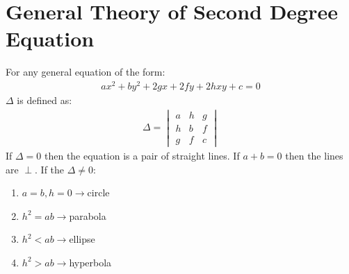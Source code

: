 \documentclass[../main.tex]{subfile}
\begin{document}
    \chapter{General Theory of Second Degree Equation}
    For any general equation of the form:
    \begin{align}
        ax^2+by^2+2gx+2fy+2hxy+c=0
    \end{align}
    $\Delta$ is defined as:
    \begin{align}
        \Delta=\begin{vmatrix}
        a&h&g\\
        h&b&f\\
        g&f&c
        \end{vmatrix}
    \end{align}
    If $\Delta=0$ then the equation is a pair of straight lines. If $a+b=0$ then the lines are $\perp$.\newline
    If the $\Delta \neq 0$:
    \begin{enumerate}
    \item $a=b, h=0\rightarrow$circle
    \item $h^2=ab\rightarrow$parabola
    \item $h^2<ab\rightarrow$ellipse
    \item $h^2>ab\rightarrow$hyperbola
    \end{enumerate}
\end{document}
